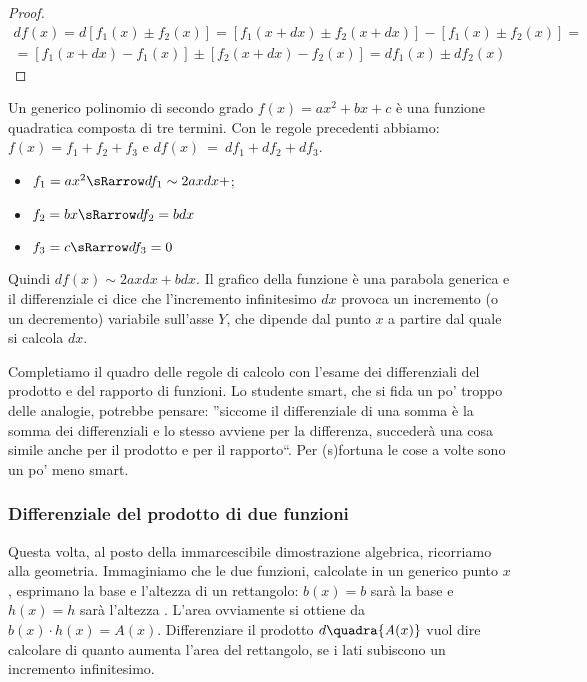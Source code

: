 \begin{proof}
\begin{align*}
 df(x)=d[f_1(x)\pm f_2(x)]=[f_1(x+dx)\pm f_2(x+dx)]-[f_1(x)\pm f_2(x)]=\\
 = [f_1(x+dx)-f_1(x)]\pm [f_2(x+dx)-f_2(x)]= df_1(x)\pm df_2(x)
\end{align*}
\end{proof}

\begin{esempio}
 Un generico polinomio di secondo grado \(f(x)=ax^2+bx+c\) è una
 funzione quadratica composta di tre termini. 
 Con le regole precedenti abbiamo: \(f(x)=f_1+f_2+f_3\) e
 \(df(x)~=~df_1+df_2+df_3\).
 \begin{itemize} [noitemsep]
  \item $f_1=ax^2 \sRarrow df_1\sim 2axdx+$; 
  \item $f_2=bx \sRarrow df_2=bdx$
  \item $f_3=c \sRarrow df_3=0$
 \end{itemize}
Quindi $df(x)\sim 2axdx+bdx$. Il grafico della funzione è una parabola generica
e il differenziale ci dice che l'incremento infinitesimo 
$dx$ provoca un incremento (o un decremento) variabile sull'asse $Y$, che 
dipende dal punto $x$ a partire dal quale si calcola $dx$.
\end{esempio}

Completiamo il quadro delle regole di calcolo con l'esame dei differenziali
del prodotto e del rapporto di funzioni. Lo studente smart, che si fida un 
po' 
troppo delle analogie, potrebbe pensare: ''siccome il differenziale di una 
somma è la somma dei differenziali e lo stesso avviene per la differenza, 
succederà una cosa simile anche per il prodotto e per il rapporto``. 
Per (s)fortuna le cose a volte sono un po' meno smart.

\subsubsection{Differenziale del prodotto di due funzioni}
\label{}
Questa volta, al posto della immarcescibile dimostrazione algebrica, 
ricorriamo
alla geometria. Immaginiamo che le due funzioni, calcolate in un generico 
punto $x$,
esprimano la base e l'altezza di un rettangolo:
$b(x)=b$ sarà la base  e $h(x)=h$ sarà l'altezza . L'area ovviamente
si ottiene da $b(x)\cdot h(x)=\mathit{A}(x)$. 
Differenziare il prodotto $d\quadra{\mathit{A}(x)}$ vuol dire calcolare di
quanto aumenta l'area del rettangolo, se i lati subiscono un incremento 
infinitesimo. 

